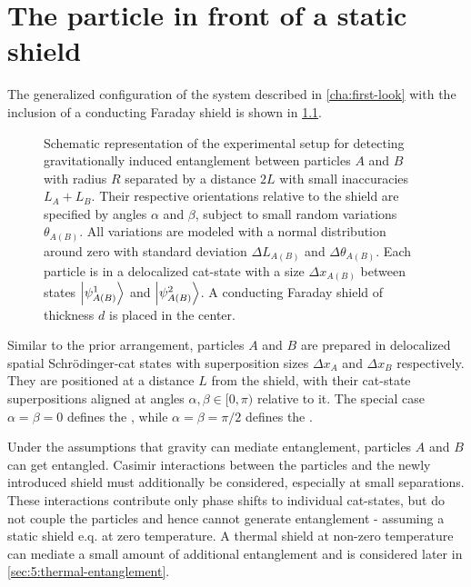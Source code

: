 \chapter{The particle in front of a static shield}\label{cha:entanglement-generation}

The generalized configuration of the system described in \cref{cha:first-look} with the inclusion of a conducting Faraday shield is shown in \cref{fig:4:complete-setup}. 
\begin{figure}[!bp]
  \centering
  \def\svgwidth{\textwidth}
  
  \caption{Schematic representation of the experimental setup for detecting gravitationally induced entanglement between particles $A$ and $B$ with radius $R$ separated by a distance $2L$ with small inaccuracies $L_A + L_B$. Their respective orientations relative to the shield are specified by angles $\alpha$ and $\beta$, subject to small random variations $\theta_{A(B)}$. All variations are modeled with a normal distribution around zero with standard deviation $\Delta L_{A(B)}$ and $\Delta \theta_{A(B)}$. Each particle is in a delocalized cat-state with a size $\Delta x_{A(B)}$ between states $\ket{\psi_{A(B)}^1}$ and $\ket{\psi_{A(B)}^2}$. A conducting Faraday shield of thickness $d$ is placed in the center.}
  \label{fig:4:complete-setup}
\end{figure}
Similar to the prior arrangement, particles $A$ and $B$ are prepared in delocalized spatial Schrödinger-cat states with superposition sizes $\Delta x_A$ and $\Delta x_B$ respectively.
They are positioned at a distance $L$ from the shield, with their cat-state superpositions aligned at angles $\alpha,\beta\in[0,\pi)$ relative to it.
The special case $\alpha=\beta=0$ defines the , while $\alpha = \beta = \pi/2$ defines the .

Under the assumptions that gravity can mediate entanglement, particles $A$ and $B$ can get entangled.
Casimir interactions between the particles and the newly introduced shield must additionally be considered, especially at small separations.
These interactions contribute only phase shifts to individual cat-states, but do not couple the particles and hence cannot generate entanglement - assuming a static shield e.q. at zero temperature.
A thermal shield at non-zero temperature can mediate a small amount of additional entanglement and is considered later in \cref{sec:5:thermal-entanglement}.

